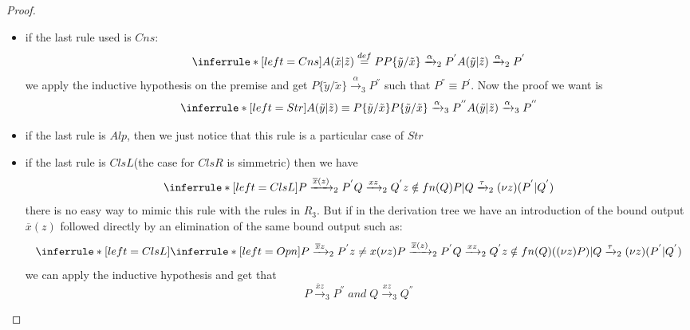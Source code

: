 \begin{theorem}
\begin{proof}
\begin{description}
\begin{description}
\begin{itemize}
		\[
		  \inferrule* [left=Str]{
		      P|Q\equiv Q|P
		    \\
		      \inferrule* [left=Par]{
			  Q\xrightarrow{\alpha}_{3}Q^{''}
			\\
			  bn(\alpha)\cap fn(Q)=\emptyset
		      }{
			  Q|P\xrightarrow{\alpha}_{3}Q^{''}|P
		      }
		    }{
		      P|Q\xrightarrow{\alpha}_{3}Q^{''}|P
		    }
		\]
		and $Q^{''}|P\equiv P|Q^{'}$
	      \item
		if the last rule used is $Cns$:
		\[
		    \inferrule* [left=Cns]{
			A(\tilde{x}|\tilde{z})\stackrel{def}{=}P
		      \\
			P\{\tilde{y}/\tilde{x}\}\xrightarrow{\alpha}_{2}P^{'}
		    }{
		      A(\tilde{y}|\tilde{z})\xrightarrow{\alpha}_{2}P^{'}
		    }
		\]
		we apply the inductive hypothesis on the premise and get $P\{\tilde{y}/\tilde{x}\}\xrightarrow{\alpha}_{3}P^{''}$ such that $P^{''}\equiv P^{'}$. Now the proof we want is
		\[
		    \inferrule* [left=Str]{
			A(\tilde{y}|\tilde{z})\equiv P\{\tilde{y}/\tilde{x}\}
		      \\
			P\{\tilde{y}/\tilde{x}\}\xrightarrow{\alpha}_{3}P^{''}
		    }{
		      A(\tilde{y}|\tilde{z})\xrightarrow{\alpha}_{3}P^{''}
		    }
		\]		
	      \item
		if the last rule is $Alp$, then we just notice that this rule is a particular case of $Str$
	      \item
		if the last rule is $ClsL$(the case for $ClsR$ is simmetric) then we have
		\[
		    \inferrule* [left=ClsL]{
			P\xrightarrow{\overline{x}(z)}_{2}P^{'}
		      \\
			Q\xrightarrow{xz}_{2}Q^{'}
		      \\
			z\notin fn(Q)
		    }{
		      P|Q\xrightarrow{\tau}_{2}(\nu z)(P^{'}|Q^{'})
		    }
		\]
		there is no easy way to mimic this rule with the rules in $R_{3}$. But if in the derivation tree we have an introduction of the bound output $\overline{x}(z)$ followed directly by an elimination of the same bound output such as:
		\[
		    \inferrule* [left=ClsL]{
			\inferrule* [left=Opn]{
			    P\xrightarrow{\overline{x}z}_{2}P^{'}
			  \\
			    z\neq x
			}{
			  (\nu z)P\xrightarrow{\overline{x}(z)}_{2}P^{'}
			}
		      \\
			Q\xrightarrow{xz}_{2}Q^{'}
		      \\
			z\notin fn(Q)
		    }{
		      ((\nu z)P)|Q\xrightarrow{\tau}_{2}(\nu z)(P^{'}|Q^{'})
		    }
		\]
		we can apply the inductive hypothesis and get that 
		\[
		  P\xrightarrow{\overline{x}z}_{3}P^{''}\; and\; Q\xrightarrow{xz}_{3}Q^{''}
\]
\end{itemize}
\end{description}
\end{description}
\end{proof}
\end{theorem}
